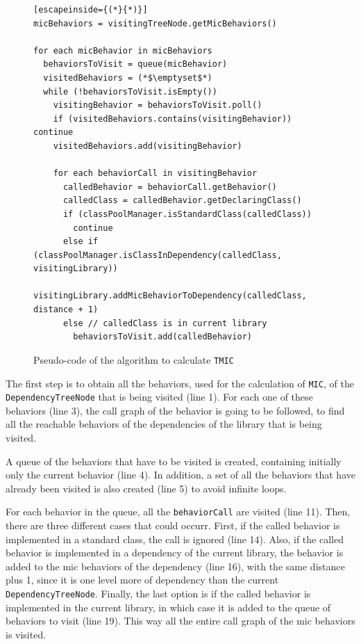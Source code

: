\begin{figure}[ht!]
\begin{lstlisting}[escapeinside={(*}{*)}]
micBehaviors = visitingTreeNode.getMicBehaviors()

for each micBehavior in micBehaviors
  behaviorsToVisit = queue(micBehavior)
  visitedBehaviors = (*$\emptyset$*)
  while (!behaviorsToVisit.isEmpty())
    visitingBehavior = behaviorsToVisit.poll()
    if (visitedBehaviors.contains(visitingBehavior)) continue
    visitedBehaviors.add(visitingBehavior)

    for each behaviorCall in visitingBehavior
      calledBehavior = behaviorCall.getBehavior()
      calledClass = calledBehavior.getDeclaringClass()
      if (classPoolManager.isStandardClass(calledClass))
        continue
      else if (classPoolManager.isClassInDependency(calledClass, visitingLibrary))
        visitingLibrary.addMicBehaviorToDependency(calledClass, distance + 1)
      else // calledClass is in current library
        behaviorsToVisit.add(calledBehavior)
\end{lstlisting}
\caption{Pseudo-code of the algorithm to calculate \texttt{TMIC}}
\label{fig:calculate-tmic}
\end{figure}

The first step is to obtain all the behaviors, used for the calculation of \texttt{MIC}, of the \texttt{DependencyTreeNode} that is being visited (line 1). For each one of these behaviors (line 3), the call graph of the behavior is going to be followed, to find all the reachable behaviors of the dependencies of the library that is being visited.

A queue of the behaviors that have to be visited is created, containing initially only the current behavior (line 4). In addition, a set of all the behaviors that have already been visited is also created (line 5) to avoid infinite loops.

For each behavior in the queue, all the \texttt{behaviorCall} are visited (line 11). Then, there are three different cases that could occurr. First, if the called behavior is implemented in a standard class, the call is ignored (line 14). Also, if the called behavior is implemented in a dependency of the current library, the behavior is added to the mic behaviors of the dependency (line 16), with the same distance plus 1, since it is one level more of dependency than the current \texttt{DependencyTreeNode}. Finally, the last option is if the called behavior is implemented in the current library, in which case it is added to the queue of behaviors to visit (line 19). This way all the entire call graph of the mic behaviors is visited.

